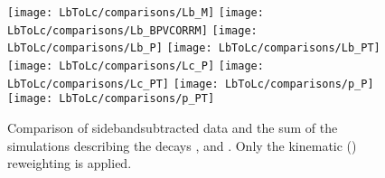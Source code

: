 \begin{figure}[hptb]
	\centering
  	\texttt{[image: LbToLc/comparisons/Lb\_M]}
  	\texttt{[image: LbToLc/comparisons/Lb\_BPVCORRM]}
  	\texttt{[image: LbToLc/comparisons/Lb\_P]}
  	\texttt{[image: LbToLc/comparisons/Lb\_PT]}
  	\texttt{[image: LbToLc/comparisons/Lc\_P]}
  	\texttt{[image: LbToLc/comparisons/Lc\_PT]}
  	\texttt{[image: LbToLc/comparisons/p\_P]}
  	\texttt{[image: LbToLc/comparisons/p\_PT]}
	\caption{Comparison of sidebandsubtracted data and the sum of the simulations describing the decays \LcTopKpi,  and . Only the kinematic \pt(\Lb) reweighting is applied.}
    \label{fig:reweight_Lc_app}
\end{figure}

